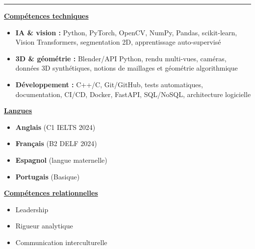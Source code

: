 \documentclass[letterpaper,10pt]{article}
\begin{document}
  

\vspace{4pt}
\noindent\rule{\textwidth}{0.4pt}
\vspace{0.4pt}

\noindent
\begin{minipage}[t]{0.39\textwidth}
  \raggedright
  \textbf{\underline{Compétences techniques}}\\[-2pt]
  {\scriptsize
    \begin{itemize}[leftmargin=*,itemsep=1pt,parsep=0pt,topsep=0pt,partopsep=0pt]
      \item \textbf{IA \& vision :} Python, PyTorch, OpenCV, NumPy, Pandas, scikit-learn, Vision Transformers, segmentation 2D, apprentissage auto-supervisé
      \item \textbf{3D \& géométrie :} Blender/API Python, rendu multi-vues, caméras, données 3D synthétiques, notions de maillages et géométrie algorithmique
      \item \textbf{Développement :} C++/C, Git/GitHub, tests automatiques, documentation, CI/CD, Docker, FastAPI, SQL/NoSQL, architecture logicielle
    \end{itemize}
  }
\end{minipage}\hfill
\begin{minipage}[t]{0.28\textwidth}
  \raggedright
  \textbf{\underline{Langues}}\\[-2pt]
  {\scriptsize
    \begin{itemize}[leftmargin=*,itemsep=0pt,parsep=0pt,topsep=0pt,partopsep=0pt]
      \item \textbf{Anglais} (C1 \textendash{} IELTS 2024)
      \item \textbf{Français} (B2 \textendash{} DELF 2024)
      \item \textbf{Espagnol} (langue maternelle)
      \item \textbf{Portugais} (Basique)
    \end{itemize}
  }

  \vspace{0.12cm}
  \textbf{\underline{Compétences relationnelles}}\\[-2pt]
  {\scriptsize
    \begin{itemize}[leftmargin=*,itemsep=1pt,parsep=0pt,topsep=0pt,partopsep=0pt]
      \item Leadership
      \item Rigueur analytique
      \item Communication interculturelle
    \end{itemize}
  }
\end{minipage}\hfill
\end{document}
